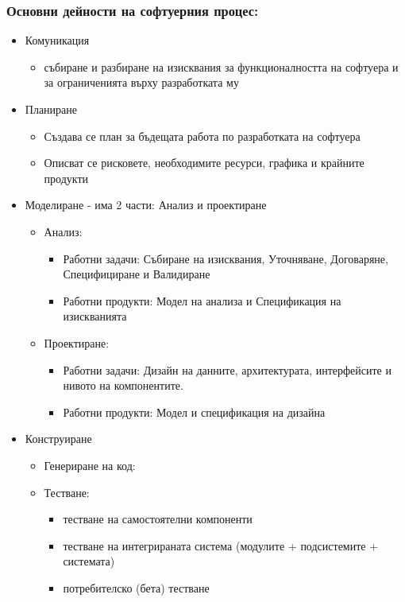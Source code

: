 \documentclass[fleqn,12pt]{article}
\begin{document}
\subsubsection{Основни дейности на софтуерния процес:}
\begin{itemize}
	
	\item Комуникация
	\begin{itemize}
		\item събиране и разбиране на изисквания за функционалността на софтуера и за ограниченията върху разработката му
	\end{itemize}
	
	\item Планиране
	\begin{itemize}
		\item Създава се план за бъдещата работа по разработката на софтуера
		\item Описват се рисковете, необходимите ресурси, графика и крайните продукти
	\end{itemize}
	
	\item Моделиране - има 2 части: Анализ и проектиране
	\begin{itemize}
		\item Анализ:
		\begin{itemize}
			\item Работни задачи: Събиране на изисквания, Уточняване, Договаряне, Специфициране и Валидиране
			\item Работни продукти: Модел на анализа и Спецификация на изискванията
		\end{itemize}
		
		\item Проектиране:
		\begin{itemize}
			\item Работни задачи: Дизайн на данните, архитектурата, интерфейсите и нивото на компонентите.
			\item Работни продукти: Модел и спецификация на дизайна
		\end{itemize}
	\end{itemize}

	\item Конструиране
	\begin{itemize}
		\item Генериране на код:
		\item Тестване:
		\begin{itemize}
			\item тестване на самостоятелни компоненти
			\item тестване на интегрираната система (модулите + подсистемите + системата)
			\item потребителско (бета) тестване
		\end{itemize}
	\end{itemize}


\end{itemize}
\end{document}
